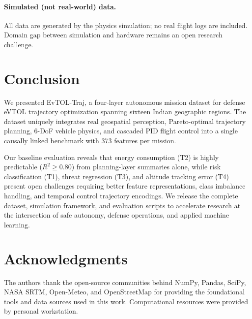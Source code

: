 \documentclass{article}
\begin{document}
\paragraph{Simulated (not real-world) data.}
All data are generated by the physics simulation; no real flight logs are
included. Domain gap between simulation and hardware remains an open research challenge.

\section{Conclusion}
\label{sec:conclusion}

We presented EvTOL-Traj, a four-layer autonomous mission dataset for defense
eVTOL trajectory optimization spanning sixteen Indian geographic regions.
The dataset uniquely integrates real geospatial perception, Pareto-optimal
trajectory planning, 6-DoF vehicle physics, and cascaded PID flight control
into a single causally linked benchmark with 373 features per mission.

Our baseline evaluation reveals that energy consumption (T2) is highly
predictable ($R^2 \geq 0.80$) from planning-layer summaries alone, while
risk classification (T1), threat regression (T3), and altitude tracking
error (T4) present open challenges requiring better feature representations,
class imbalance handling, and temporal control trajectory encodings.
We release the complete dataset, simulation framework, and evaluation
scripts to accelerate research at the intersection of safe autonomy,
defense operations, and applied machine learning.

\section*{Acknowledgments}

The authors thank the open-source communities behind NumPy, Pandas, SciPy,
NASA SRTM, Open-Meteo, and OpenStreetMap for providing the foundational
tools and data sources used in this work. Computational resources were
provided by personal workstation.




\appendix
\end{document}

